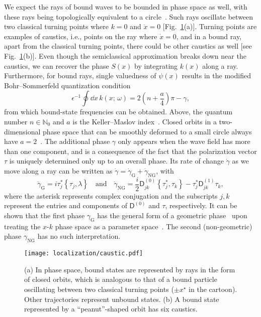 We expect the rays of bound waves to be bounded in phase space as well, with these rays being topologically equivalent to a circle~\cite{keller1958,mcdonald1988}.
Such rays oscillate between two classical turning points where $k = 0$ and $\dot{x} = 0$ [Fig.~\ref{fig:caustic}(a)].
Turning points are examples of caustics, i.e., points on the ray where $\dot{x} = 0$, and in a bound ray, apart from the classical turning points, there could be other caustics as well [see Fig.~\ref{fig:caustic}(b)].
Even though the semiclassical approximation breaks down near the caustics, we can recover the phase $S(x)$ by integrating $k(x)$ along a ray.
Furthermore, for bound rays, single valuedness of $\psi(x)$ results in the modified Bohr--Sommerfeld quantization condition
%
\begin{equation}
  \epsilon^{-1}\oint \dd{x}\,k(x;\, \omega) = 2\left(n + \frac{a}{4}\right)\pi - \gamma,
  \label{eq:quantization}
\end{equation}
%
from which bound-state frequencies can be obtained.
Above, the quantum number $n \in \mathbb{N}_{0}$ and $a$ is the Keller--Maslov index~\cite{keller1958,maslov1981}.
Closed orbits in a two-dimensional phase space that can be smoothly deformed to a small circle always have $a = 2$~\cite{percival1977}.
The additional phase $\gamma$ only appears when the wave field has more than one component, and is a consequence of the fact that the polarization vector $\tau$ is uniquely determined only up to an overall phase.
Its rate of change $\dot{\gamma}$ as we move along a ray can be written as $\dot{\gamma} = \dot{\gamma}_{\text{G}} + \dot{\gamma}_{\text{NG}}$, with~\cite{yabana1986,kaufman1987,venaille2023}
%
\begin{equation}
\dot{\gamma}_{\text{G}} = i\tau_{j}^{*}\left\{\tau_{j}, \lambda\right\} %
  \quad\text{and}\quad
  \dot{\gamma}_{\text{NG}} = \frac{i}{2}\mathsf{D}^{(0)}_{jk}\left\{\tau^{*}_{j}, \tau_{k}\right\} - \tau_{j}^{*}\mathsf{D}^{(1)}_{jk}\tau_{k},
  \label{eq:extra_phases}
\end{equation}
%
where the asterisk represents complex conjugation and the subscripts $j, k$ represent the entries and components of $\mathsf{D}^{(0)}$ and $\tau$, respectively.
It can be shown that the first phase $\gamma_{\text{G}}$ has the general form of a geometric phase~\cite{pancharatnam1956,berry1984} upon treating the $x$-$k$ phase space as a parameter space~\cite{yabana1986}.
The second (non-geometric) phase $\gamma_{\text{NG}}$ has no such interpretation.
%
\begin{figure}
  \begin{center}
    \texttt{[image: localization/caustic.pdf]}
  \end{center}
  \caption{%
    (a) In phase space, bound states are represented by rays in the form of closed orbits, which is analogous to that of a bound particle oscillating between two classical turning points ($\pm x^{\star}$ in the cartoon).
    Other trajectories represent unbound states.
    (b) A bound state represented by a ``peanut''-shaped orbit has six caustics.%
  }
  \label{fig:caustic}
\end{figure}
